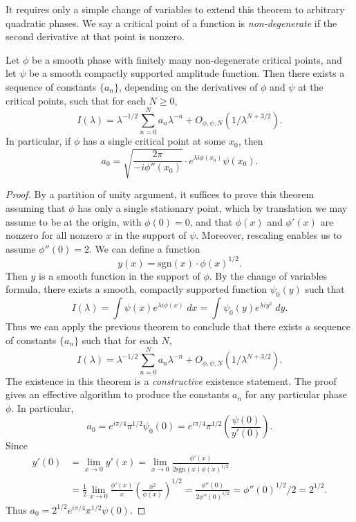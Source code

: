 It requires only a simple change of variables to extend this theorem to arbitrary quadratic phases. We say a critical point of a function is \emph{non-degenerate} if the second derivative at that point is nonzero.

\begin{theorem}
  Let $\phi$ be a smooth phase with finitely many non-degenerate critical points, and let $\psi$ be a smooth compactly supported amplitude function. Then there exists a sequence of constants $\{ a_n \}$, depending on the derivatives of $\phi$ and $\psi$ at the critical points, such that for each $N \geq 0$,
  \[ I(\lambda) = \lambda^{-1/2} \sum_{n = 0}^N a_n \lambda^{-n} + O_{\phi,\psi,N} ( 1/\lambda^{N+3/2} ). \]
  In particular, if $\phi$ has a single critical point at some $x_0$, then
  \[ a_0 = \sqrt{ \frac{2\pi}{-i \phi''(x_0)} } \cdot e^{\lambda i \phi(x_0)} \psi(x_0). \]
\end{theorem}
\begin{proof}
  By a partition of unity argument, it suffices to prove this theorem assuming that $\phi$ has only a single stationary point, which by translation we may assume to be at the origin, with $\phi(0) = 0$, and that $\phi(x)$ and $\phi'(x)$ are nonzero for all nonzero $x$ in the support of $\psi$. Moreover, rescaling enables us to assume $\phi''(0) = 2$. We can define a function
  \[ y(x) = \text{sgn}(x) \cdot \phi(x)^{1/2}. \]
  Then $y$ is a smooth function in the support of $\phi$. By the change of variables formula, there exists a smooth, compactly supported function $\psi_0(y)$ such that
  \[ I(\lambda) = \int \psi(x) e^{\lambda i \phi(x)}\; dx = \int \psi_0(y) e^{\lambda i y^2}\; dy. \]
  Thus we can apply the previous theorem to conclude that there exists a sequence of constants $\{ a_n \}$ such that for each $N$,
  \[ I(\lambda) = \lambda^{-1/2} \sum_{n = 0}^N a_n \lambda^{-n} + O_{\phi,\psi,N}(1/\lambda^{N+3/2}). \]
  The existence in this theorem is a \emph{constructive} existence statement. The proof gives an effective algorithm to produce the constants $a_n$ for any particular phase $\phi$. In particular,
  \[ a_0 = e^{i\pi/4} \pi^{1/2} \psi_0(0) = e^{i\pi/4} \pi^{1/2} \left( \frac{\psi(0)}{y'(0)} \right). \]
  Since
  \begin{align*}
    y'(0) &= \lim_{x \to 0} y'(x) = \lim_{x \to 0} \frac{\phi'(x)}{2 \text{sgn}(x) \phi(x)^{1/2}}\\
    &= \frac{1}{2} \lim_{x \to 0} \frac{\phi'(x)}{x} \left( \frac{x^2}{\phi(x)} \right)^{1/2} = \frac{\phi''(0)}{2 \phi''(0)^{1/2}} = \phi''(0)^{1/2}/2 = 2^{1/2}.
  \end{align*}
  Thus $a_0 = 2^{1/2} e^{i\pi/4} \pi^{1/2} \psi(0)$.
\end{proof}

